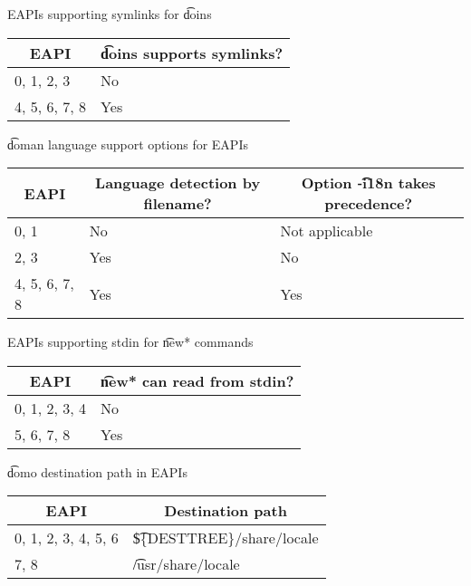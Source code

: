 \begin{centertable}{EAPIs supporting symlinks for \t{doins}}
    \label{tab:doins-table}
    \begin{tabular}{ll}
      \toprule
      \multicolumn{1}{c}{\textbf{EAPI}} &
      \multicolumn{1}{c}{\textbf{\t{doins} supports symlinks?}} \\
      \midrule
      0, 1, 2, 3        & No  \\
      4, 5, 6, 7, 8     & Yes \\
      \bottomrule
    \end{tabular}
\end{centertable}

\begin{centertable}{\t{doman} language support options for EAPIs}
    \label{tab:doman-table}
    \begin{tabular}{lll}
      \toprule
      \multicolumn{1}{c}{\textbf{EAPI}} &
      \multicolumn{1}{c}{\textbf{Language detection by filename?}} &
      \multicolumn{1}{c}{\textbf{Option \t{-i18n} takes precedence?}} \\
      \midrule
      0, 1              & No  & Not applicable \\
      2, 3              & Yes & No             \\
      4, 5, 6, 7, 8     & Yes & Yes            \\
      \bottomrule
    \end{tabular}
\end{centertable}

\begin{centertable}{EAPIs supporting stdin for \t{new*} commands}
    \label{tab:newfoo-stdin-table}
    \begin{tabular}{ll}
      \toprule
      \multicolumn{1}{c}{\textbf{EAPI}} &
      \multicolumn{1}{c}{\textbf{\t{new*} can read from stdin?}} \\
      \midrule
      0, 1, 2, 3, 4     & No  \\
      5, 6, 7, 8        & Yes \\
      \bottomrule
    \end{tabular}
\end{centertable}

\begin{centertable}{\t{domo} destination path in EAPIs}
    \label{tab:domo-path}
    \begin{tabular}{ll}
      \toprule
      \multicolumn{1}{c}{\textbf{EAPI}} &
      \multicolumn{1}{c}{\textbf{Destination path}} \\
      \midrule
      0, 1, 2, 3, 4, 5, 6 & \t{\$\{DESTTREE\}/share/locale} \\
      7, 8                & \t{/usr/share/locale} \\
      \bottomrule
    \end{tabular}
\end{centertable}

